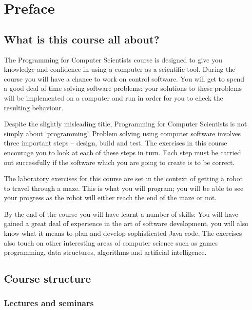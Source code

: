 
\section{Preface}

\subsection{What is this course all about?}

The Programming for Computer Scientists course is designed to give you 
knowledge and confidence in using a computer as a scientific tool. 
During the course you will have a chance to work on control software. 
You will get to spend a good deal of time solving software problems; your
solutions to these problems will be implemented on a computer and run in
order for you to check the resulting behaviour. 

Despite the slightly misleading title, Programming for Computer Scientists
is not simply about `programming'. Problem solving using computer software 
involves three important steps -- design, build and test. The exercises in 
this course encourage you to look at each of these steps in turn. Each step 
must be carried out successfully if the software which you are going to 
create is to be correct. 
 
The laboratory exercises for this course are set in the context of getting a 
robot to travel through a maze. This is what you will program; you will 
be able to see your progress as the robot will either reach the end of the 
maze or not. 
 
By the end of the course you will have learnt a number of skills: You will 
have gained a great deal of experience in the art of software development,
you will also know what it means to plan and develop sophisticated Java 
code. The exercises also touch on other interesting areas of computer 
science such as games programming, data structures, algorithms and 
artificial intelligence.  

\subsection{Course structure}

\subsubsection{Lectures and seminars}

